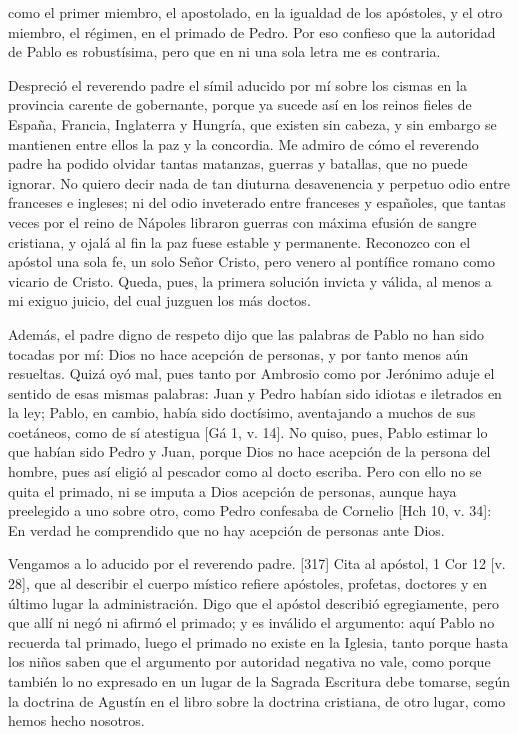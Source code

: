 como el primer miembro, el apostolado, en la igualdad de los apóstoles, y el otro miembro, el régimen, en el primado de Pedro. Por eso confieso que la autoridad de Pablo es robustísima, pero que en ni una sola letra me es contraria.

Despreció el reverendo padre el símil aducido por mí sobre los cismas en la provincia carente de gobernante, porque ya sucede así en los reinos fieles de España, Francia, Inglaterra y Hungría, que existen sin cabeza, y sin embargo se mantienen entre ellos la paz y la concordia. Me admiro de cómo el reverendo padre ha podido olvidar tantas matanzas, guerras y batallas, que no puede ignorar. No quiero decir nada de tan diuturna desavenencia y perpetuo odio entre franceses e ingleses; ni del odio inveterado entre franceses y españoles, que tantas veces por el reino de Nápoles libraron guerras con máxima efusión de sangre cristiana, y ojalá al fin la paz fuese estable y permanente. Reconozco con el apóstol una sola fe, un solo Señor Cristo, pero venero al pontífice romano como vicario de Cristo. Queda, pues, la primera solución invicta y válida, al menos a mi exiguo juicio, del cual juzguen los más doctos.

Además, el padre digno de respeto dijo que las palabras de Pablo no han sido tocadas por mí: Dios no hace acepción de personas, y por tanto menos aún resueltas. Quizá oyó mal, pues tanto por Ambrosio como por Jerónimo aduje el sentido de esas mismas palabras: Juan y Pedro habían sido idiotas e iletrados en la ley; Pablo, en cambio, había sido doctísimo, aventajando a muchos de sus coetáneos, como de sí atestigua [Gá 1, v. 14]. No quiso, pues, Pablo estimar lo que habían sido Pedro y Juan, porque Dios no hace acepción de la persona del hombre, pues así eligió al pescador como al docto escriba. Pero con ello no se quita el primado, ni se imputa a Dios acepción de personas, aunque haya preelegido a uno sobre otro, como Pedro confesaba de Cornelio [Hch 10, v. 34]: En verdad he comprendido que no hay acepción de personas ante Dios.

Vengamos a lo aducido por el reverendo padre. [317] Cita al apóstol, 1 Cor 12 [v. 28], que al describir el cuerpo místico refiere apóstoles, profetas, doctores y en último lugar la administración. Digo que el apóstol describió egregiamente, pero que allí ni negó ni afirmó el primado; y es inválido el argumento: aquí Pablo no recuerda tal primado, luego el primado no existe en la Iglesia, tanto porque hasta los niños saben que el argumento por autoridad negativa no vale, como porque también lo no expresado en un lugar de la Sagrada Escritura debe tomarse, según la doctrina de Agustín en el libro sobre la doctrina cristiana, de otro lugar, como hemos hecho nosotros.

